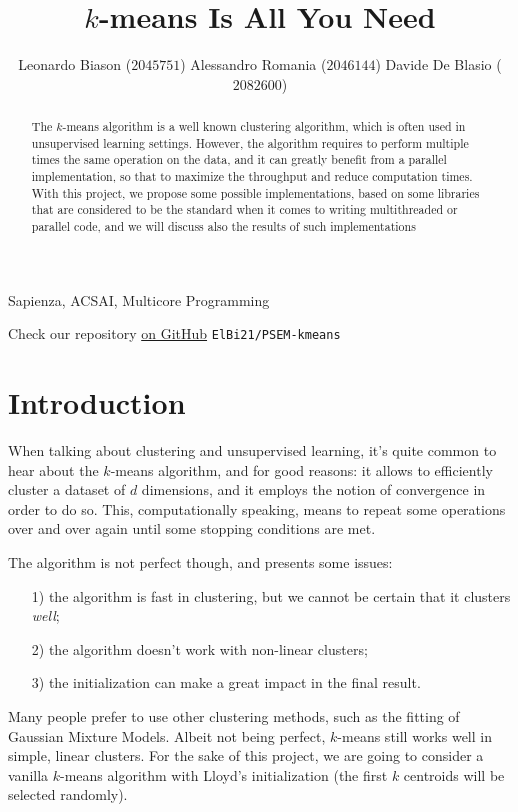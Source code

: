 \documentclass[11pt, journal]{IEEEtran}
\title{$k$-means Is All You Need}
\author{Leonardo Biason ($2045751$) \quad Alessandro Romania ($2046144$) \quad Davide De Blasio ($2082600$)}
\newcommand{\nwl}{

\vspace{11pt}

}
\begin{document}
\maketitle

\begin{abstract}
    The $k$-means algorithm is a well known clustering algorithm, which is often used in unsupervised learning settings. However, the algorithm requires to perform multiple times the same operation on the data, and it can greatly benefit from a parallel implementation, so that to maximize the throughput and reduce computation times. With this project, we propose some possible implementations, based on some libraries that are considered to be the  standard when it comes to writing multithreaded or parallel code, and we will discuss also the results of such implementations
\end{abstract}

\begin{keywords}
    Sapienza, ACSAI, Multicore Programming
\end{keywords}
\nwl
\begin{tcolorbox}[colback = Purple!20, colframe = Purple!40]
    \begin{center}
         Check our repository \href{https://www.github.com/ElBi21/PSEM-kmeans}{on GitHub}
        \verb|ElBi21/PSEM-kmeans|
    \end{center}
\end{tcolorbox}

\section{Introduction}

When talking about clustering and unsupervised learning, it's quite common to hear about the $k$-means algorithm, and for good reasons: it allows to efficiently cluster a dataset of $d$ dimensions, and it employs the notion of convergence in order to do so. This, computationally speaking, means to repeat some operations over and over again until some stopping conditions are met.

\nwl

The algorithm is not perfect though, and presents some issues:
\begin{itemize}
    \item [1)] the algorithm is fast in clustering, but we cannot be certain that it clusters \textit{well};
    \item [2)] the algorithm doesn't work with non-linear clusters;
    \item [3)] the initialization can make a great impact in the final result.
\end{itemize}
\nwl
Many people prefer to use other clustering methods, such as the fitting of Gaussian Mixture Models. Albeit not being perfect, $k$-means still works well in simple, linear clusters. For the sake of this project, we are going to consider a vanilla $k$-means algorithm with Lloyd's initialization (the first $k$ centroids will be selected randomly).
\end{document}
